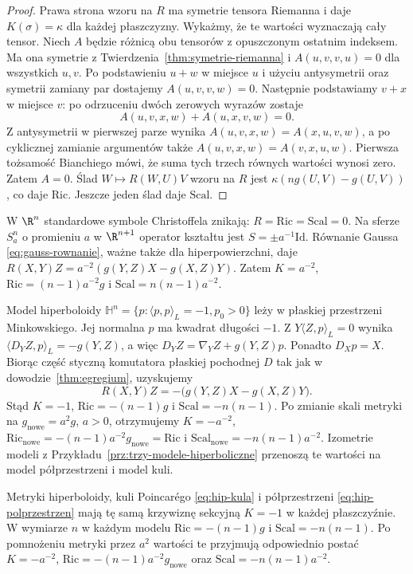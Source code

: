\begin{proof}
Prawa strona wzoru na $R$ ma symetrie tensora
Riemanna i daje $K(\sigma)=\kappa$ dla każdej
płaszczyzny. Wykażmy, że te wartości wyznaczają
cały tensor. Niech $A$ będzie różnicą obu tensorów
z opuszczonym ostatnim indeksem. Ma ona symetrie
z Twierdzenia~\ref{thm:symetrie-riemanna} i
$A(u,v,v,u)=0$ dla wszystkich $u,v$.
Po podstawieniu $u+w$ w miejsce $u$ i użyciu
antysymetrii oraz symetrii zamiany par dostajemy
$A(u,v,v,w)=0$. Następnie podstawiamy $v+x$
w miejsce $v$: po odrzuceniu dwóch zerowych
wyrazów zostaje
\[
 A(u,v,x,w)+A(u,x,v,w)=0.
\]
Z antysymetrii w pierwszej parze wynika
$A(u,v,x,w)=A(x,u,v,w)$, a po cyklicznej
zamianie argumentów także
$A(u,v,x,w)=A(v,x,u,w)$. Pierwsza tożsamość
Bianchiego mówi, że suma tych trzech równych
wartości wynosi zero. Zatem $A=0$.
Ślad $W\mapsto R(W,U)V$ wzoru na $R$ jest
$\kappa(ng(U,V)-g(U,V))$, co daje $\mathrm{Ric}$.
Jeszcze jeden ślad daje $\mathrm{Scal}$.
\end{proof}

\begin{przyklad}\label{prz:krzywizna-modele}
W $\R^n$ standardowe symbole Christoffela znikają:
$R=\mathrm{Ric}=\mathrm{Scal}=0$. Na sferze $S_a^n$
o promieniu $a$ w $\R^{n+1}$ operator kształtu
jest $S=\pm a^{-1}\mathrm{Id}$. Równanie Gaussa
\eqref{eq:gauss-rownanie}, ważne także dla
hiperpowierzchni, daje
$R(X,Y)Z=a^{-2}(g(Y,Z)X-g(X,Z)Y)$.
Zatem $K=a^{-2}$, $\mathrm{Ric}=(n-1)a^{-2}g$
i $\mathrm{Scal}=n(n-1)a^{-2}$.

Model hiperboloidy $\mathbb H^n=\{p:\langle p,p\rangle_L=-1,
p_0>0\}$ leży w płaskiej przestrzeni Minkowskiego.
Jej normalna $p$ ma kwadrat długości $-1$.
Z $Y\langle Z,p\rangle_L=0$ wynika
$\langle D_YZ,p\rangle_L=-g(Y,Z)$, a więc
$D_YZ=\nabla_YZ+g(Y,Z)p$. Ponadto $D_Xp=X$.
Biorąc część styczną komutatora płaskiej pochodnej
$D$ tak jak w dowodzie~\ref{thm:egregium}, uzyskujemy
\[
 R(X,Y)Z=-\bigl(g(Y,Z)X-g(X,Z)Y\bigr).
\]
Stąd $K=-1$, $\mathrm{Ric}=-(n-1)g$ i
$\mathrm{Scal}=-n(n-1)$. Po zmianie skali metryki
na $g_{\mathrm{nowe}}=a^2g$, $a>0$, otrzymujemy
$K=-a^{-2}$, $\mathrm{Ric}_{\mathrm{nowe}}
=-(n-1)a^{-2}g_{\mathrm{nowe}}=\mathrm{Ric}$ i
$\mathrm{Scal}_{\mathrm{nowe}}=-n(n-1)a^{-2}$.
Izometrie modeli z Przykładu~\ref{prz:trzy-modele-hiperboliczne}
przenoszą te wartości na model półprzestrzeni
i model kuli.
\end{przyklad}

\begin{stwierdzenie}
\label{prop:krzywizna-trzy-modele-hiperboliczne}
Metryki hiperboloidy, kuli Poincarégo
\eqref{eq:hip-kula} i półprzestrzeni
\eqref{eq:hip-polprzestrzen} mają tę samą
krzywiznę sekcyjną $K=-1$ w każdej płaszczyźnie.
W wymiarze $n$ w każdym modelu
$\mathrm{Ric}=-(n-1)g$ i
$\mathrm{Scal}=-n(n-1)$. Po pomnożeniu metryki
przez $a^2$ wartości te przyjmują odpowiednio
postać $K=-a^{-2}$,
$\mathrm{Ric}=-(n-1)a^{-2}g_{\mathrm{nowe}}$
oraz $\mathrm{Scal}=-n(n-1)a^{-2}$.
\end{stwierdzenie}

